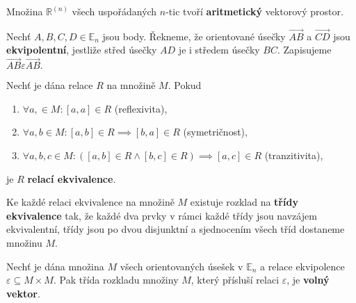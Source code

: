 \begin{pozn}
    Množina $\mathbb R^{(n)}$ všech uspořádaných $n$-tic tvoří \textbf{aritmetický}
    vektorový prostor.
\end{pozn}

\begin{definition}
    Nechť $A,B,C,D \in \mathbb E_n$ jsou body. Řekneme, že orientované úsečky
    $\overrightarrow{AB}$ a $\overrightarrow{CD}$ jsou \textbf{ekvipolentní}, jestliže
    střed úsečky $AD$ je i středem úsečky $BC$. Zapisujeme $\overrightarrow{AB}\varepsilon\overrightarrow{AB}.$
\end{definition}

\begin{definition}
    Nechť je dána relace $R$ na množině $M$. Pokud
    \begin{enumerate}[$i.$]
    \item $\forall a,\in M:[a,a] \in R$ (reflexivita),
   	\item $\forall a,b\in M: [a,b]\in R \implies [b,a] \in R$ (symetričnost),
   	\item $\forall a,b,c\in M: ([a,b]\in R \land [b,c] \in R) \implies [a,c] \in R$ (tranzitivita),
    \end{enumerate}
    je $R$ \textbf{relací ekvivalence}.
\end{definition}

\begin{pozn}
    Ke každé relaci ekvivalence na množině $M$ existuje rozklad na
    \textbf{třídy ekvivalence} tak, že každé dva prvky v rámci každé třídy jsou navzájem ekvivalentní,
    třídy jsou po dvou disjunktní a sjednocením všech tříd dostaneme množinu $M$.
\end{pozn}

\begin{definition}
    Nechť je dána množina $M$ všech orientovaných úsešek v $\mathbb E_n$ a
    relace ekvipolence $\varepsilon \subseteq M\times M.$ Pak třída rozkladu množiny
    $M$, který přísluší relaci $\varepsilon$, je \textbf{volný vektor}.
\end{definition}

